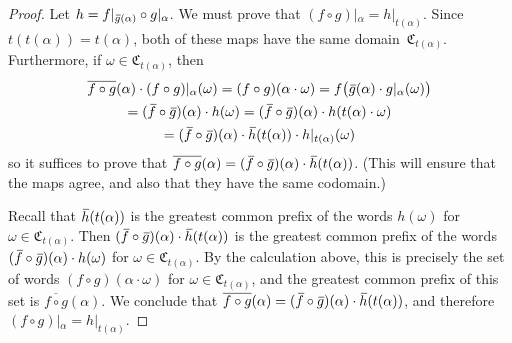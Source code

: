 \documentclass[11pt,letterpaper]{amsart}
\theoremstyle{definition}
\newcommand{\C}{\mathfrak{C}}
\newcommand{\of}{\mkern 3.5mu\overline{\mkern-3.5mu f\mkern0.75mu}\mkern-0.75mu}
\newcommand{\og}{\mkern 2mu\overline{\mkern-2mu g\mkern0.5mu}\mkern-0.5mu}
\newcommand{\oh}{\mkern 2mu\overline{\mkern-2mu h\mkern-0.25mu}\mkern 0.25mu}
\begin{document}
\begin{proof}
Let $h=f|_{\og(\alpha)}\circ g|_\alpha$. 
 We must prove that $(f\circ g)|_\alpha = h|_{t(\alpha)}$.  Since $t(t(\alpha))=t(\alpha)$,
 both of these maps have the same domain~$\C_{t(\alpha)}$.  Furthermore, if $\omega\in \C_{t(\alpha)}$, then
\begin{multline*}
\overline{f\circ g}(\alpha)\cdot (f\circ g)|_\alpha(\omega) = (f\circ g)(\alpha\cdot\omega)
= f\bigl(\og(\alpha)\cdot g|_\alpha(\omega)\bigr) \\ = (\of\circ\og)(\alpha) \cdot h(\omega) = (\of\circ\og)(\alpha) \cdot h(t(\alpha)\cdot\omega) \\ = (\of\circ\og)(\alpha) \cdot \oh(t(\alpha)) \cdot h|_{t(\alpha)}(\omega)
\end{multline*}
so it suffices to prove that $\overline{f\circ g}(\alpha) = (\of\circ\og)(\alpha)\cdot \oh(t(\alpha))$.  (This will ensure that the maps agree, and also that they have the same codomain.)

Recall that $\oh(t(\alpha))$ is the greatest common prefix of the words $h(\omega)$ for $\omega\in \C_{t(\alpha)}$.  Then $(\of\circ\og)(\alpha)\cdot \oh(t(\alpha))$ is the greatest common prefix of the words $(\of\circ\og)(\alpha)\cdot h(\omega)$ for $\omega\in \C_{t(\alpha)}$.  By the calculation above, this is precisely the set of words $(f\circ g)(\alpha\cdot\omega)$ for $\omega\in \C_{t(\alpha)}$, and the greatest common prefix of this set is $\overline{f\circ g}(\alpha)$.  We conclude that $\overline{f\circ g}(\alpha) = (\of\circ\og)(\alpha)\cdot \oh(t(\alpha))$, and therefore  $(f\circ g)|_\alpha = h|_{t(\alpha)}
$.
\end{proof}
\end{document}
